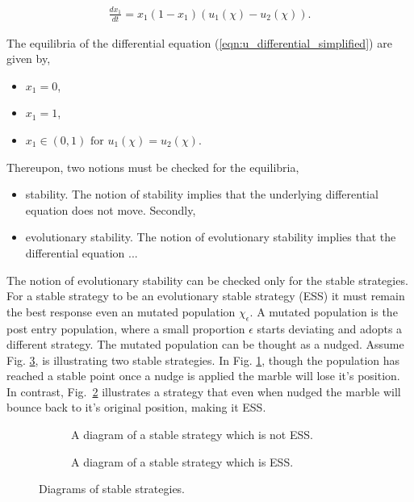\documentclass[10pt]{article}
\begin{document}
\begin{eqnarray}
	\label{eqn:u_differential_simplified}
	\frac{dx_1}{dt}= x_1(1 - x_1)(u_1(\chi) - u_2(\chi)).
\end{eqnarray}

The equilibria of the differential equation (\ref{eqn:u_differential_simplified})
are given by,

\begin{itemize}
	\item \(x_1=0\),
	\item \(x_1=1\),
	\item \(x_1 \in (0, 1) \mbox{ for } u_1(\chi)=u_2(\chi)\).
\end{itemize}

Thereupon, two notions must be checked for the equilibria,

\begin{itemize}
	\item stability. The notion of stability implies that the underlying differential
	equation does not move. Secondly, 
	\item evolutionary stability. The notion of evolutionary stability implies
	that the  differential equation ...
\end{itemize}

The notion of evolutionary stability can be checked only for the stable strategies.
For a stable strategy to be an evolutionary stable strategy (ESS) it must remain 
the best response even an mutated population \(\chi_\epsilon\). A mutated population is the post entry population, 
where a small proportion \(\epsilon\) starts deviating and adopts a different strategy.
The mutated population can be thought as a nudged.  Assume Fig.
\ref{fig:stable_ess_driagrams}, is illustrating two stable strategies. In Fig.
\ref{fig:stable_diagram}, though the population has reached a stable point once 
a nudge is applied the marble will lose it's position. In contrast, Fig.~\ref{fig:ess_diagram}
illustrates a strategy that even when nudged the marble will bounce back to it's
original position, making it ESS.

\begin{figure}[!htbp]
\begin{center}
    \begin{subfigure}{0.40\textwidth}
	
	\caption{\label{fig:stable_diagram} A diagram of a stable strategy which 
	is not ESS.}
    \end{subfigure}
    \begin{subfigure}{0.40\textwidth}
	
	\caption{\label{fig:ess_diagram}A diagram of a stable strategy which is ESS.}
    \end{subfigure}
    	\caption{\label{fig:stable_ess_driagrams} Diagrams of stable strategies.}
\end{center}
\end{figure}
\end{document}
